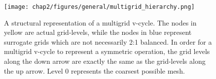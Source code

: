 \begin{figure}
\texttt{[image: chap2/figures/general/multigrid\_hierarchy.png]}
\caption{
  \label{fig:vcycle}
  A structural representation of a multigrid v-cycle. The nodes in yellow are actual grid-levels, while the nodes in blue represent surrogate grids which are not necessarily 2:1 balanced. In order for a multigrid v-cycle to represent a symmetric operation, the grid levels along the down arrow are exactly the same as the grid-levels along the up arrow. Level 0 represents the coarsest possible mesh.} 
\end{figure}
